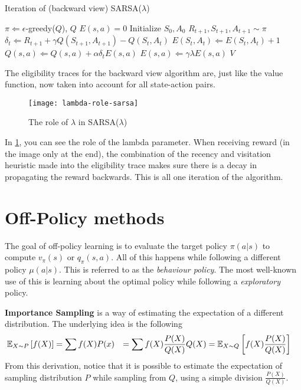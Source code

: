 \begin{algorithm}[H]
	\caption{Iteration of (backward view) SARSA($\lambda$)}
	\label{alg:MC-eval}
	\begin{algorithmic}
		\REQUIRE $\pi \Leftarrow \epsilon$-greedy($Q$), $Q$
		\STATE $E(s, a) = 0$
		\STATE Initialize $S_0, A_0$
		\STATE $R_{t+1}, S_{t+1}, A_{t+1} \sim \pi$
		\STATE $\delta_t \Leftarrow R_{t+1} + \gamma Q(S_{t+1}, A_{t+1}) - Q(S_t, A_t)$
		\STATE $E(S_t, A_t) \Leftarrow E(S_t, A_t) + 1$
		\STATE $Q(s, a) \Leftarrow Q(s, a) + \alpha \delta_t E(s, a)$
		\STATE $E(s, a) \Leftarrow \gamma \lambda E(s, a)$
		\ENDFOR
		\ENDFOR
		\RETURN $V$
	\end{algorithmic}
\end{algorithm}

The eligibility traces for the backward view algorithm are, just like the value function, now taken into account for all state-action pairs.

\begin{figure}[H]
	\centering
	\texttt{[image: lambda-role-sarsa]}
	\caption{The role of $\lambda$ in SARSA($\lambda$)}
	\label{fig:lambda-sarsa-role}
\end{figure}

In \ref{fig:lambda-sarsa-role}, you can see the role of the lambda parameter. When receiving reward (in the image only at the end), the combination of the recency and visitation heuristic made into the eligibility trace makes sure there is a decay in propagating the reward backwards. This is all one iteration of the algorithm.

\section{Off-Policy methods}

The goal of off-policy learning is to evaluate the target policy $\pi(a|s)$ to compute $v_\pi(s)$ or $q_\pi(s, a)$. All of this happens while following a different policy $\mu(a|s)$. This is referred to as the \textit{behaviour policy}. The most well-known use of this is learning about the optimal policy while following a \textit{exploratory} policy.

\textbf{Importance Sampling} is a way of estimating the expectation of a different distribution. The underlying idea is the following
\begin{equation*}
	\begin{aligned}
		\operatorname{\mathbb{E}}_{X \sim P} \left[f(X)\right] & = \sum f(X) P(x)
										& = \sum f(X)\frac{P(X)}{Q(X)} Q(X)
										& = \operatorname{\mathbb{E}}_{X \sim Q} \left[f(X) \frac{P(X)}{Q(X)}\right]
	\end{aligned}
\end{equation*}
From this derivation, notice that it is possible to estimate the expectation of sampling distribution $P$ while sampling from $Q$, using a simple division $\frac{P(X)}{Q(X)}$.

